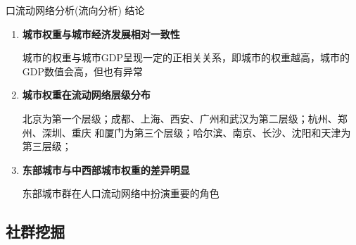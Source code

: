 \begin{frame}[t]{口流动网络分析(流向分析)}
    \alert{结论}

    \begin{enumerate}
        \pause
        \item \textbf{城市权重与城市经济发展相对一致性}

        城市的权重与城市GDP呈现一定的正相关关系，即城市的权重越高，城市的GDP数值会高，但也有异常

        \pause
        \item \textbf{城市权重在流动网络层级分布}

        北京为第一个层级；成都、上海、西安、广州和武汉为第二层级；杭州、郑州、深圳、重庆
        和厦门为第三个层级；哈尔滨、南京、长沙、沈阳和天津为第三层级；

        \pause
        \item \textbf{东部城市与中西部城市权重的差异明显}

        东部城市群在人口流动网络中扮演重要的角色
    \end{enumerate}
\end{frame}



\subsection{社群挖掘}

